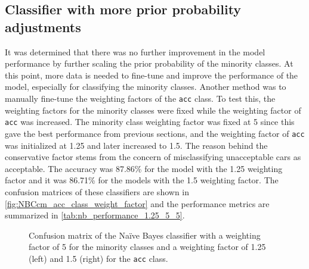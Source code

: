 \documentclass[a4paper]{article}
\begin{document}
\subsection{Classifier with more prior probability adjustments} 
It was determined that there was no further improvement in the model performance by further scaling the prior probability of the minority classes. At this point, more data is needed to fine-tune and improve the performance of the model, especially for classifying the minority classes. Another method was to manually fine-tune the weighting factors of the \lstinline{acc} class. To test this, the weighting factors for the minority classes were fixed while the weighting factor of \lstinline{acc} was increased. The minority class weighting factor was fixed at 5 since this gave the best performance from previous sections, and the weighting factor of \lstinline{acc} was initialized at 1.25 and later increased to 1.5. The reason behind the conservative factor stems from the concern of misclassifying unacceptable cars as acceptable. The accuracy was 87.86\% for the model with the 1.25 weighting factor and it was 86.71\% for the models with the 1.5 weighting factor. The confusion matrices of these classifiers are shown in \autoref{fig:NBCcm_acc_class_weight_factor} and the performance metrics are summarized in \autoref{tab:nb_performance_1.25_5_5}.


\begin{figure}[h!]
  \centering
  \caption{Confusion matrix of the Naïve Bayes classifier with a weighting factor of 5 for the minority classes and a weighting factor of 1.25 (left) and 1.5 (right) for the \lstinline{acc} class.}
  \label{fig:NBCcm_acc_class_weight_factor}
\end{figure}
\end{document}
